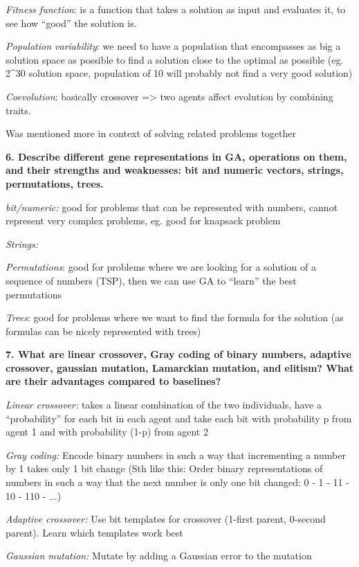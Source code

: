 \textit{Fitness function}: is a function that takes a solution as
input and evaluates it, to see how ``good'' the solution is.

\textit{Population variability}: we need to have a population that
encompasses as big a solution space as possible to find a solution close
to the optimal as possible (eg. 2\^{}30 solution space, population of 10
will probably not find a very good solution)

\textit{Coevolution}: basically crossover =\textgreater{} two agents
affect evolution by combining traits.

Was mentioned more in context of solving related problems together

\textbf{6. Describe different gene representations in GA, operations on
them, and their strengths and weaknesses: bit and numeric vectors,
strings, permutations, trees.}

\textit{bit/numeric:} good for problems that can be represented with
numbers, cannot represent very complex problems, eg. good for knapsack
problem

\textit{Strings:}

\textit{Permutations}: good for problems where we are looking for a
solution of a sequence of numbers (TSP), then we can use GA to ``learn''
the best permutations

\textit{Trees}: good for problems where we want to find the formula
for the solution (as formulas can be nicely represented with trees)

\textbf{7. What are linear crossover, Gray coding of binary numbers,
adaptive crossover, gaussian mutation, Lamarckian mutation, and elitism?
What are their advantages compared to baselines?}

\textit{Linear crossover:} takes a linear combination of the two
individuals, have a ``probability'' for each bit in each agent and take
each bit with probability p from agent 1 and with probability (1-p) from
agent 2

\textit{Gray coding:} Encode binary numbers in such a way that
incrementing a number by 1 takes only 1 bit change (Sth like this: Order
binary representations of numbers in such a way that the next number is
only one bit changed: 0 - 1 - 11 - 10 - 110 - ...)

\textit{Adaptive crossover:} Use bit templates for crossover (1-first
parent, 0-second parent). Learn which templates work best

\textit{Gaussian mutation:} Mutate by adding a Gaussian error to the
mutation

